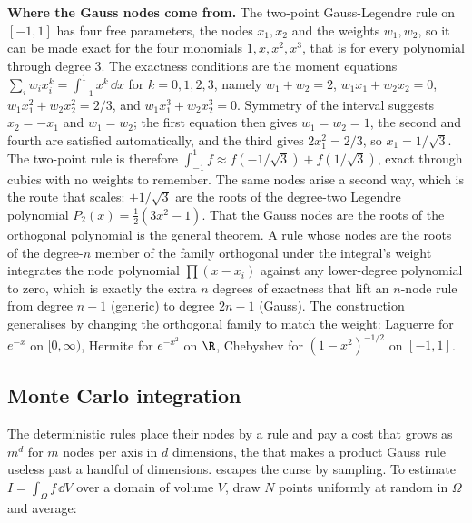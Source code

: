 \begin{example}
\textbf{Where the Gauss nodes come from.} The two-point Gauss-Legendre
rule on $[-1, 1]$ has four free parameters, the nodes $x_{1}, x_{2}$ and
the weights $w_{1}, w_{2}$, so it can be made exact for the four monomials
$1, x, x^{2}, x^{3}$, that is for every polynomial through degree $3$. The
exactness conditions are the moment equations $\sum_{i} w_{i} x_{i}^{k} =
\int_{-1}^{1} x^{k}\, \dd x$ for $k = 0, 1, 2, 3$, namely $w_{1} + w_{2} =
2$, $w_{1}x_{1} + w_{2}x_{2} = 0$, $w_{1}x_{1}^{2} + w_{2}x_{2}^{2} =
2/3$, and $w_{1}x_{1}^{3} + w_{2}x_{2}^{3} = 0$. Symmetry of the interval
suggests $x_{2} = -x_{1}$ and $w_{1} = w_{2}$; the first equation then gives
$w_{1} = w_{2} = 1$, the second and fourth are satisfied automatically, and
the third gives $2 x_{1}^{2} = 2/3$, so $x_{1} = 1/\sqrt{3}$. The two-point
rule is therefore $\int_{-1}^{1} f \approx f(-1/\sqrt{3}) + f(1/\sqrt{3})$,
exact through cubics with no weights to remember. The same nodes arise a
second way, which is the route that scales: $\pm 1/\sqrt{3}$ are the roots
of the degree-two Legendre polynomial $P_{2}(x) = \tfrac{1}{2}(3x^{2} - 1)$.
That the Gauss nodes are the roots of the orthogonal polynomial is the
general theorem. A rule whose nodes are the roots of the degree-$n$ member
of the family orthogonal under the integral's weight integrates the node
polynomial $\prod(x - x_{i})$ against any lower-degree polynomial to zero,
which is exactly the extra $n$ degrees of exactness that lift an $n$-node
rule from degree $n - 1$ (generic) to degree $2n - 1$ (Gauss). The
construction generalises by changing the orthogonal family to match the
weight: Laguerre for $e^{-x}$ on $[0, \infty)$, Hermite for $e^{-x^{2}}$ on
$\R$, Chebyshev for $(1 - x^{2})^{-1/2}$ on $[-1, 1]$.
\end{example}

\subsection{Monte Carlo integration}

The deterministic rules place their nodes by a rule and pay a cost that grows
as $m^{d}$ for $m$ nodes per axis in $d$ dimensions, the  that makes a product Gauss rule useless past a handful of
dimensions.  escapes the curse by sampling.
To estimate $I = \int_{\Omega} f\, \dd V$ over a domain of volume $V$, draw $N$
points uniformly at random in $\Omega$ and average:

